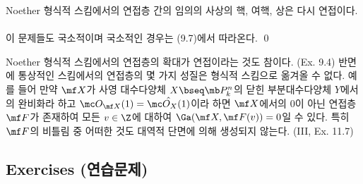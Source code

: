 	
	\begin{corollary}
	Noether 형식적 스킴에서의 연접층 간의 임의의 사상의 핵, 여핵, 상은 다시 연접이다.\\\\
	\pf 이 문제들도 국소적이며 국소적인 경우는 (9.7)에서 따라온다.
	\qed
	\end{corollary}
	
	
	\begin{remark}
	Noether 형식적 스킴에서의 연접층의 확대가 연접이라는 것도 참이다. (Ex. 9.4)
	반면에 통상적인 스킴에서의 연접층의 몇 가지 성질은 형식적 스킴으로 옮겨올 수 없다.
	예를 들어 만약 $\mf X$가 사영 대수다양체 $X\bseq\mb P_k^n$의 닫힌 부분대수다양체 $Y$에서의 완비화라 하고
	$\mc O_{\mf X}(1)=\hat{\mc O_X(1)}$이라 하면 $\mf X$에서의 0이 아닌 연접층 $\mf F$가 존재하여
	모든 $v\in\Z$에 대하여 $\Ga(\mf X,\mf F(v))=0$일 수 있다.
	특히 $\mf F$의 비틀림 중 어떠한 것도 대역적 단면에 의해 생성되지 않는다. (III, Ex. 11.7)
	\end{remark}
	
	
	
	\subsection*{Exercises (연습문제)}
	
